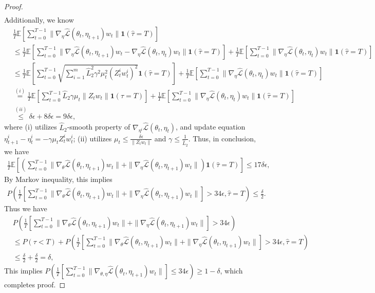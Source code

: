\documentclass[twoside]{article} %
\theoremstyle{plain}
\theoremstyle{definition}
\theoremstyle{remark}
\newcommand{\hL}{\hat{L}}
\newcommand{\htau}{\hat{\tau}}
\newcommand{\fhL}{\hat{\mathcal{L}}}
\begin{document}
\begin{proof}
\begin{align}
\end{align}
Additionally, we know
\begin{align}
    &\frac{1}{T}\mathbb{E}[\sum_{t=0}^{T-1}\|\nabla_{\eta}\fhL(\theta_t,\eta_{t+1})w_t\|\mathbf{1}(\htau = T)]\nonumber\\
    &\leq \frac{1}{T}\mathbb{E}[ \sum_{t=0}^{T-1}\|\nabla_{\eta}\fhL(\theta_t,\eta_{t+1})w_t - \nabla_{\eta}\fhL(\theta_t,\eta_t)w_t\|\mathbf{1}(\htau = T)]+\frac{1}{T}\mathbb{E}[\sum_{t=0}^{T-1}\|\nabla_{\eta}\fhL(\theta_t,\eta_t)w_t\|\mathbf{1}(\htau = T)]\nonumber\\
    &\leq\frac{1}{T}\mathbb{E}[\sum_{t=0}^{T-1}\sqrt{\sum_{i=1}^{m}\hL_2^2\gamma^2\mu_t^2(Z_t^iw_t^i)^2}\mathbf{1}(\htau = T)] + \frac{1}{T}\mathbb{E}[\sum_{t=0}^{T-1}\|\nabla_{\eta}\fhL(\theta_t,\eta_t)w_t\|\mathbf{1}(\htau= T)]\nonumber\\
    &\overset{(i)}{=} \frac{1}{T}\mathbb{E}[\sum_{t=0}^{T-1}\hL_2\gamma\mu_t\|Z_tw_t\|\mathbf{1}(\htau = T)]+ \frac{1}{T}\mathbb{E}[\sum_{t=0}^{T-1}\|\nabla_{\eta}\fhL(\theta_t,\eta_t)w_t\|\mathbf{1}(\htau= T)]\nonumber\\
    &\overset{(ii)}{\leq} \delta\epsilon+8\delta\epsilon = 9\delta\epsilon,
\end{align}
where (i) utilizes $\hL_2$-smooth property of $\nabla_{\eta^i}\fhL(\theta_t,\eta_t)$, and update equation $\eta_{t+1}^i-\eta_t^i=-\gamma \mu_tZ_t^iw_t^i$; (ii) utilizes $\mu_t\leq \frac{\delta\epsilon}{\|Z_tw_t \|}$ and $\gamma\leq \frac{1}{\hL_2}$.
Thus, in conclusion, we have
\begin{align}
    \frac{1}{T}\mathbb{E}[(\sum_{t=0}^{T-1}\|\nabla_{\theta}\fhL(\theta_t,\eta_{t+1})w_t\|+\|\nabla_{\eta}\fhL(\theta_t,\eta_{t+1})w_t \|)\mathbf{1}(\htau = T)]\leq 17\delta\epsilon,
\end{align}
By Markov inequality, this implies
\begin{align}
    P(
    \frac{1}{T}[\sum_{t=0}^{T-1}\|\nabla_{\theta}\fhL(\theta_t,\eta_{t+1})w_t\|+\|\nabla_{\eta}\fhL(\theta_t,\eta_{t+1})w_t \|]>34{\epsilon},\htau = T)\leq \frac{\delta}{2}.
\end{align}
Thus we have
\begin{align}
    &P(\frac{1}{T}[\sum_{t=0}^{T-1}\|\nabla_{\theta}\fhL(\theta_t,\eta_{t+1})w_t\|+\|\nabla_{\eta}\fhL(\theta_t,\eta_{t+1})w_t \|]{>} 34{\epsilon})\nonumber\\
    &\leq P(\tau<T) + P(
    \frac{1}{T}[\sum_{t=0}^{T-1}\|\nabla_{\theta}\fhL(\theta_t,\eta_{t+1})w_t\|+\|\nabla_{\eta}\fhL(\theta_t,\eta_{t+1})w_t \|]>34{\epsilon},\htau = T)\nonumber\\
    &\leq \frac{\delta}{2} + \frac{\delta}{2}= \delta,
\end{align}
This implies $P(\frac{1}{T}[\sum_{t=0}^{T-1}\|\nabla_{\theta,\eta}\fhL(\theta_t,\eta_{t+1})w_t\|]\leq 34{\epsilon})\geq 1-\delta$, which completes proof.
\end{proof}
\end{document}
